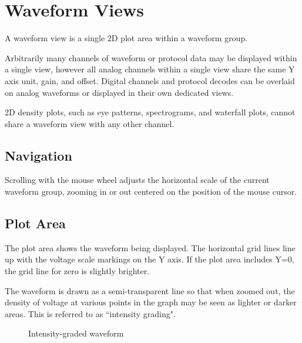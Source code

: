 \chapter{Waveform Views}

A waveform view is a single 2D plot area within a waveform group.

Arbitrarily many channels of waveform or protocol data may be displayed within a single view, however all analog
channels within a single view share the same Y axis unit, gain, and offset. Digital channels and protocol decodes can
be overlaid on analog waveforms or displayed in their own dedicated views.

2D density plots, such as eye patterns, spectrograms, and waterfall plots, cannot share a waveform view
with any other channel.

\section{Navigation}

Scrolling with the mouse wheel adjusts the horizontal scale of the current waveform group, zooming in or out centered
on the position of the mouse cursor.



\section{Plot Area}

The plot area shows the waveform being displayed. The horizontal grid lines line up with the voltage scale markings on
the Y axis. If the plot area includes Y=0, the grid line for zero is slightly brighter.

The waveform is drawn as a semi-transparent line so that when zoomed out, the density of voltage at various points in
the graph may be seen as lighter or darker areas. This is referred to as ``intensity grading".

\begin{figure}[H]
\centering
{}
\caption{Intensity-graded waveform}
\label{graded-waveform2}
\end{figure}

